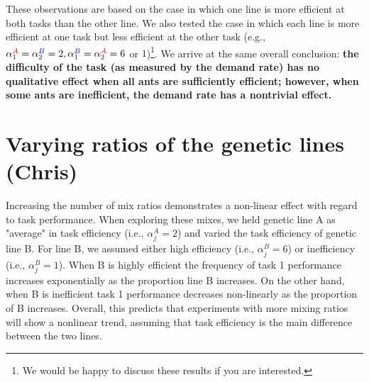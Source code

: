 \documentclass[11pt]{article}
\newcommand{\A}{{\color{red}A}}
\newcommand{\B}{{\color{blue}B}}
\begin{document}
These observations are based on the case in which one line is more efficient at both tasks than the other line. We also tested the case in which each line is more efficient at one task but less efficient at the other task (e.g., $\alpha_{1}^{\A} = \alpha_{2}^{\B} = 2, \alpha_{1}^{\B} = \alpha_{2}^{\A} = 6$ or $1$)\footnote{We would be happy to discuss these results if you are interested.}. We arrive at the same overall conclusion: \textbf{the difficulty of the task (as measured by the demand rate) has no qualitative effect when all ants are sufficiently efficient; however, when some ants are inefficient, the demand rate has a nontrivial effect.}




\section{Varying ratios of the genetic lines (Chris)}
Increasing the number of mix ratios demonstrates a non-linear effect with regard to task performance. When exploring these mixes, we held genetic line A as "average" in task efficiency (i.e., $\alpha_j^A = 2$) and varied the task efficiency of genetic line B. For line B, we assumed either high efficiency (i.e., $\alpha_j^B = 6$) or inefficiency (i.e., $\alpha_j^B = 1$). When B is highly efficient the frequency of task 1 performance increases exponentially as the proportion line B increases. On the other hand, when B is inefficient task 1 performance decreases non-linearly as the proportion of B increases. Overall, this predicts that experiments with more mixing ratios will show a nonlinear trend, assuming that task efficiency is the main difference between the two lines. 
\end{document}
